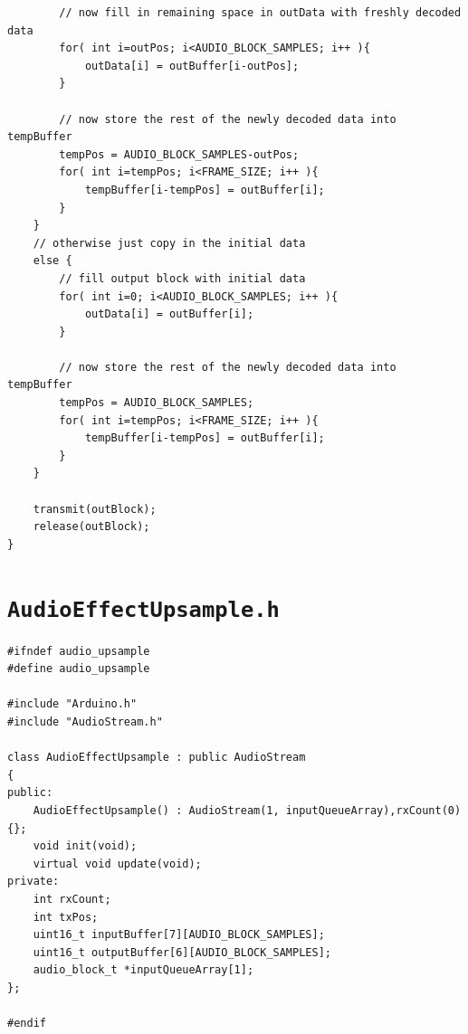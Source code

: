 \documentclass[letterpaper]{article}
\begin{document}
\begin{verbatim}
		// now fill in remaining space in outData with freshly decoded data
		for( int i=outPos; i<AUDIO_BLOCK_SAMPLES; i++ ){
			outData[i] = outBuffer[i-outPos];
		}
		
		// now store the rest of the newly decoded data into tempBuffer
		tempPos = AUDIO_BLOCK_SAMPLES-outPos;
		for( int i=tempPos; i<FRAME_SIZE; i++ ){
			tempBuffer[i-tempPos] = outBuffer[i];
		}
	} 
	// otherwise just copy in the initial data 
	else {
		// fill output block with initial data
		for( int i=0; i<AUDIO_BLOCK_SAMPLES; i++ ){
			outData[i] = outBuffer[i];
		}
		
		// now store the rest of the newly decoded data into tempBuffer
		tempPos = AUDIO_BLOCK_SAMPLES;
		for( int i=tempPos; i<FRAME_SIZE; i++ ){
			tempBuffer[i-tempPos] = outBuffer[i];
		}
	}
	
	transmit(outBlock);
	release(outBlock);
}
\end{verbatim}

\section{\texttt{AudioEffectUpsample.h}}
\begin{verbatim}
#ifndef audio_upsample
#define audio_upsample

#include "Arduino.h"
#include "AudioStream.h"

class AudioEffectUpsample : public AudioStream
{
public:
	AudioEffectUpsample() : AudioStream(1, inputQueueArray),rxCount(0) {};
	void init(void);
	virtual void update(void);
private:
	int rxCount;
	int txPos;
	uint16_t inputBuffer[7][AUDIO_BLOCK_SAMPLES];
	uint16_t outputBuffer[6][AUDIO_BLOCK_SAMPLES];
	audio_block_t *inputQueueArray[1];
};

#endif
\end{verbatim}
\end{document}
